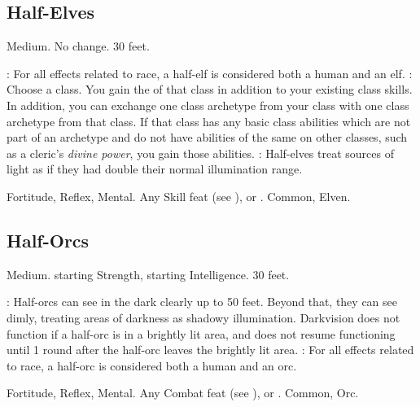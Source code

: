 \subsection{Half-Elves}
 Medium.
 No change.
 30 feet.
\begin{itemize}
    : For all effects related to race, a half-elf is considered both a human and an elf.
    : Choose a class.
        You gain the  of that class in addition to your existing class skills.
        In addition, you can exchange one class archetype from your class with one class archetype from that class.
        If that class has any basic class abilities which are not part of an archetype and do not have abilities of the same on other classes, such as a cleric's \textit{divine power}, you gain those abilities.
    : Half-elves treat sources of light as if they had double their normal illumination range.
\end{itemize}
  Fortitude, Reflex, Mental.
 Any Skill feat (see ), or .
 Common, Elven.

\subsection{Half-Orcs}
 Medium.
  starting Strength,  starting Intelligence.
 30 feet.
\begin{itemize}
    : Half-orcs can see in the dark clearly up to 50 feet.   Beyond that, they can see dimly, treating areas of darkness as shadowy illumination. Darkvision does not function if a half-orc is in a brightly lit area, and does not resume functioning until 1 round after the half-orc leaves the brightly lit area.
    : For all effects related to race, a half-orc is considered both a human and an orc.
\end{itemize}
  Fortitude,  Reflex,  Mental.
 Any Combat feat (see ), or .
 Common, Orc.

